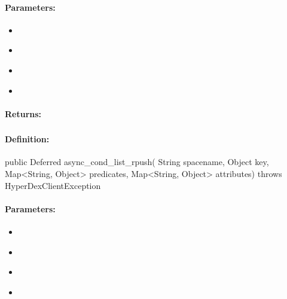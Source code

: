\paragraph{Parameters:}
\begin{itemize}[noitemsep]
\item {}\\

\item {}\\

\item {}\\

\item {}\\

\end{itemize}

\paragraph{Returns:}


\pagebreak
\subsubsection{}
\label{api:java:async_cond_list_rpush}


\paragraph{Definition:}
\begin{javacode}
public Deferred async_cond_list_rpush(
        String spacename,
        Object key,
        Map<String, Object> predicates,
        Map<String, Object> attributes) throws HyperDexClientException
\end{javacode}

\paragraph{Parameters:}
\begin{itemize}[noitemsep]
\item {}\\

\item {}\\

\item {}\\

\item {}\\

\end{itemize}


